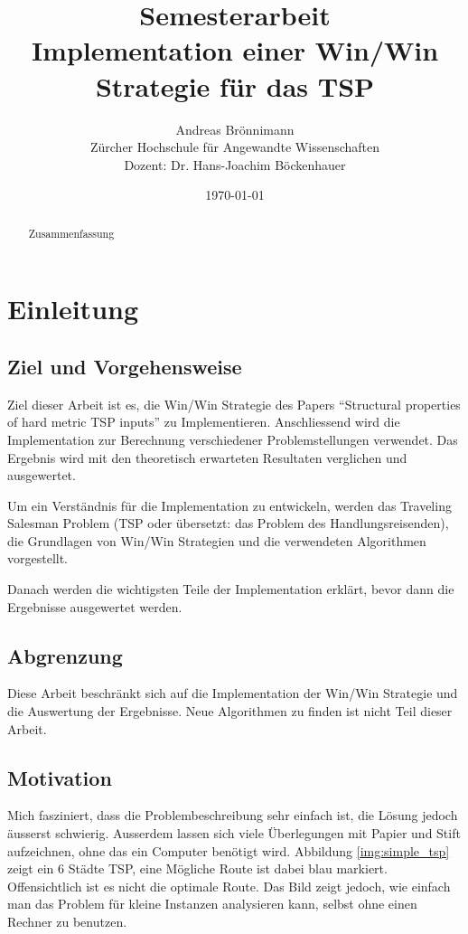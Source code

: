 \documentclass[11pt,a4paper]{article}
\title {Semesterarbeit\\
Implementation einer Win/Win Strategie für das TSP\\}
\author {Andreas Brönnimann\\
Zürcher Hochschule für Angewandte Wissenschaften\\
Dozent: Dr. Hans-Joachim Böckenhauer}
\date {\today}
\begin{document}
\nocite{*}

\maketitle
\setcounter{page}{0}
\thispagestyle{empty}
\newpage

\begin{abstract}
    Zusammenfassung
\end{abstract}

\newpage

\tableofcontents
\newpage
\section{Einleitung}
\subsection{Ziel und Vorgehensweise}
Ziel dieser Arbeit ist es, die Win/Win Strategie des Papers "`Structural properties of hard metric TSP inputs"'\cite{moemke11} zu Implementieren. Anschliessend wird die Implementation zur Berechnung verschiedener Problemstellungen verwendet. Das Ergebnis wird mit den theoretisch erwarteten Resultaten verglichen und ausgewertet.

Um ein Verständnis für die Implementation zu entwickeln, werden das Traveling Salesman Problem (TSP oder übersetzt: das Problem des Handlungsreisenden), die Grundlagen von Win/Win Strategien und die verwendeten Algorithmen vorgestellt. 

Danach werden die wichtigsten Teile der Implementation erklärt, bevor dann die Ergebnisse ausgewertet werden. 

\subsection{Abgrenzung}
Diese Arbeit beschränkt sich auf die Implementation der Win/Win Strategie und die Auswertung der Ergebnisse. Neue Algorithmen zu finden ist nicht Teil dieser Arbeit.

\subsection{Motivation}
Mich fasziniert, dass die Problembeschreibung sehr einfach ist, die Lösung jedoch äusserst schwierig.
Ausserdem lassen sich viele Überlegungen mit Papier und Stift aufzeichnen, ohne das ein Computer benötigt wird. 
Abbildung \ref{img:simple_tsp} zeigt ein 6 Städte TSP, eine Mögliche Route ist dabei blau markiert. Offensichtlich ist es nicht die optimale Route. Das Bild zeigt jedoch, wie einfach man das Problem für kleine Instanzen analysieren kann, selbst ohne einen Rechner zu benutzen.
\end{document}
